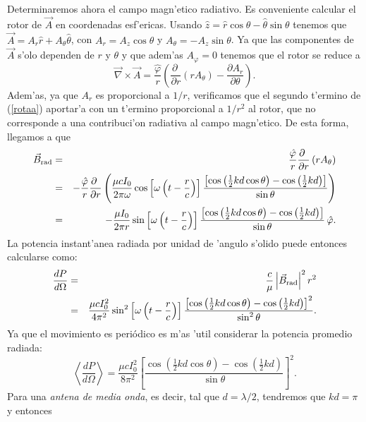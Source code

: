 Determinaremos ahora el campo magn'etico radiativo. Es conveniente calcular el rotor de $\vec{A}$ en coordenadas esf'ericas. Usando $\hat{z}=\hat{r}\cos\theta-\hat{\theta}\sin\theta$
tenemos que $\vec{A}=A_r\hat{r}+A_\theta\hat{\theta}$, con $A_r=A_z\cos\theta$ y $A_\theta=-A_z\sin\theta$. Ya que las componentes de $\vec{A}$ s'olo dependen de $r$ y $\theta$ y que adem'as $A_\varphi=0$ tenemos que el rotor se reduce a
\begin{equation}
 \vec{\nabla}\times\vec{A}=\frac{\hat{\varphi}}{r}\left(\frac{\partial\ }{\partial r}\left(rA_\theta\right)-\frac{\partial A_r}{\partial\theta}\right). \label{rotaa}
\end{equation}
Adem'as, ya que $A_r$ es proporcional a $1/r$, verificamos que el segundo t'ermino de (\ref{rotaa}) aportar'a con un t'ermino proporcional a $1/r^2$ al rotor, que no corresponde a una contribuci'on radiativa al campo magn'etico. De esta forma, llegamos a que
\begin{eqnarray}
 \vec{B}_{\rm rad}&=&\frac{\hat{\varphi}}{r}\frac{\partial\ }{\partial r}\left(rA_\theta\right) \\
&=&-\frac{\hat{\varphi}}{r}\frac{\partial\ }{\partial r}\left(\frac{\mu cI_0}{2\pi\omega}\cos\left[\omega\left(t-\frac{r}{c}\right)\right]\frac{\left[\cos\left(\frac{1}{2}kd\cos\theta\right)-\cos\left(\frac{1}{2}kd\right)\right]}{\sin\theta}\right) \\
&=&-\frac{\mu I_0}{2\pi r}\sin\left[\omega\left(t-\frac{r}{c}\right)\right]\frac{\left[\cos\left(\frac{1}{2}kd\cos\theta\right)-\cos\left(\frac{1}{2}kd\right)\right]}{\sin\theta}\,\hat{\varphi}.
\end{eqnarray}
La potencia instant'anea radiada por unidad de 'angulo s'olido puede entonces calcularse como:
\begin{eqnarray}
 \frac{dP}{d\Omega}&=&\frac{c}{\mu}\left|\vec{B}_{\rm rad}\right|^2 r^2\\
&=&\frac{\mu c I_0^2}{4\pi^2}\sin^2\left[\omega\left(t-\frac{r}{c}\right)\right]\frac{\left[\cos\left(\frac{1}{2}kd\cos\theta\right)-\cos\left(\frac{1}{2}kd\right)\right]^2}{\sin^2\theta}.
\end{eqnarray}
Ya que el movimiento es periódico es m'as 'util considerar la potencia promedio radiada:
\begin{equation}
 \left\langle\frac{dP}{d\Omega}\right\rangle=\frac{\mu cI_0^2}{8\pi^2}\left[\frac{\cos\left(\frac{1}{2}kd\cos\theta\right)-\cos\left(\frac{1}{2}kd\right)}{\sin\theta}\right]^2.
\end{equation}
Para una \textit{antena de media onda}, es decir, tal que $d=\lambda/2$, tendremos que $kd=\pi$ y entonces
